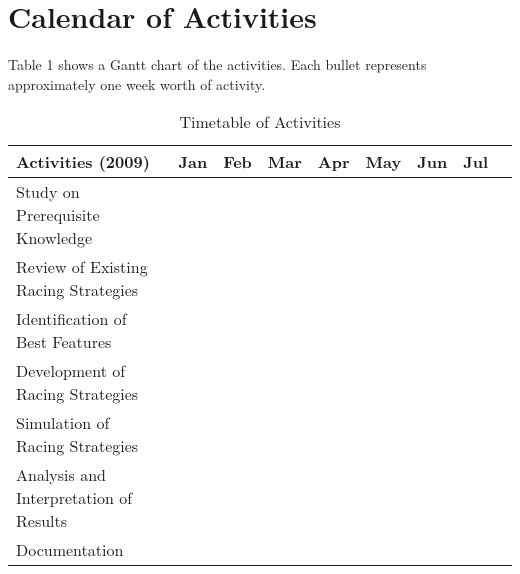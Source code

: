 	\section{Calendar of Activities}
	Table 1 shows a Gantt chart of the activities. Each bullet represents approximately one week worth of activity.
	
	
	\begin{table}[ht]
		\centering
		\caption{Timetable of Activities} \vspace{0.25em}
		\begin{tabular}{|p{2in}|c|c|c|c|c|c|c|c|} 
			\hline
			\textbf{Activities (2009)} & \textbf{Jan} & \textbf{Feb} & \textbf{Mar} & \textbf{Apr} & \textbf{May} & \textbf{Jun} & \textbf{Jul} \\ \hline
			Study on Prerequisite Knowledge      &   &   & \weektwo & \weekfour &   &   &   \\ \hline
			Review of Existing Racing Strategies & \weektwo & \weekfour & \weekfour & \weekfour &   &   &   \\ \hline
			Identification of Best Features      &   &   &   & \weekfour & \weektwo &   &   \\ \hline
			Development of Racing Strategies     &   &   &   & \weektwo & \weekfour & \weektwo &   \\ \hline
			Simulation of Racing Strategies      &   &   &   & \weektwo & \weekfour & \weekthree &   \\ \hline
			Analysis and Interpretation of Results &   &   &   &   & \weekfour & \weekfour & \weekone \\ \hline
			Documentation & \weektwo & \weekfour & \weekfour & \weekfour & \weekfour & \weekfour & \weektwo \\ \hline
		\end{tabular}
		\label{tab:timetableactivities}
	\end{table}
	

